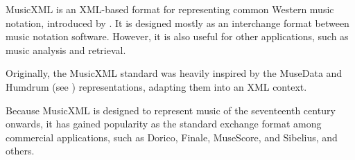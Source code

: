 


MusicXML is an XML-based format for representing common Western music notation, introduced by \textcite{good2001musicxml}. It is designed mostly as an interchange format between music notation software. However, it is also useful for other applications, such as music analysis and retrieval.

Originally, the MusicXML standard was heavily inspired by the MuseData and Humdrum (see ) representations, adapting them into an XML context.



Because MusicXML is designed to represent music of the seventeenth century onwards, it has gained popularity as the standard exchange format among commercial applications, such as Dorico, Finale, MuseScore, and Sibelius, and others.


